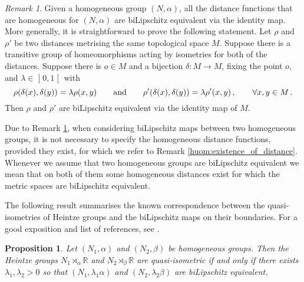 \documentclass[a4paper,12pt]{amsart}
\newcommand{\vali}[1]{\mathopen{]} #1 \mathclose{[}}
\theoremstyle{plain}
\theoremstyle{definition}
\theoremstyle{plain}
\newtheorem{prop}[maar]{Proposition}
\theoremstyle{remark}
\newtheorem{huom}[maar]{Remark}
\begin{document}
\begin{huom}\label{2017-09-12_kysymys}
	Given a homogeneous group \( (N,\alpha) \), all the distance functions that are homogeneous for \( (N,\alpha) \) are biLipschitz equivalent via the identity map.
	More generally, it is straightforward to prove the following statement.
	Let \( \rho \) and \( \rho' \) be two 
	distances metrising the same topological space \( M \).
	Suppose there is a transitive group of homeomorphisms acting by isometries for both of the distances.
	Suppose there is \( o \in M \) and
	a bijection \( \delta \colon M \to M \), fixing the point \(o\), and \( \lambda \in \vali{0,1} \) with 
	\begin{equation*}  %
	\rho(\delta(x),\delta(y)) = \lambda \rho(x,y) 
	\qquad \text{and} \qquad
	\rho'(\delta(x),\delta(y)) = \lambda \rho'(x,y) \pilkku \qquad \forall x,y \in M
	\piste
	\end{equation*}
	Then \( \rho \) and \( \rho' \) are biLipschitz equivalent via the identity map of \( M\).
\end{huom}


	Due to Remark \ref{2017-09-12_kysymys}, when considering biLipschitz maps between two homogeneous groups, it is not necessary to specify the homogeneous distance functions, provided they exist, for which we refer to Remark \ref{huom:existence_of_distance}. Whenever we assume that two homogeneous groups are biLipschitz equivalent
	we mean that on both of them some homogeneous distances exist for which the metric spaces are biLipschitz equivalent.
	


The following result summarises the known correspondence between the quasi-iso\-met\-ries of Heintze groups and the biLipschitz maps on their boundaries. For a good exposition and list of references, see \cite[p.6]{avain:CPS}.


\begin{prop} \label{go-to-the-boundary}
	Let \( (N_1, \alpha) \) and \( (N_2, \beta) \) be homogeneous groups. Then the Heintze groups \( N_1 \rtimes_\alpha \mathbb{R} \) and \( N_2 \rtimes_\beta \mathbb{R} \) are quasi-isometric if and only if there exists \( \lambda_1,\lambda_2 > 0 \) so that \( (N_1, \lambda_1 \alpha) \) and \( (N_2, \lambda_2 \beta) \) are biLipschitz equivalent.
\end{prop}
\end{document}

